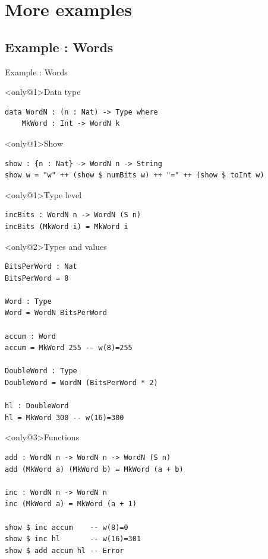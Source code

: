 \documentclass{beamer}
\begin{document}

\section{More examples}
\subsection{Example : Words}
\begin{frame}[fragile]{Example : Words}
	
	\begin{block}<only@1>{Data type}
		\begin{lstlisting}[basicstyle=\ttfamily\scriptsize]
data WordN : (n : Nat) -> Type where
	MkWord : Int -> WordN k
		\end{lstlisting}
	\end{block}
	\begin{block}<only@1>{Show}
	\begin{lstlisting}[basicstyle=\ttfamily\scriptsize]
show : {n : Nat} -> WordN n -> String
show w = "w" ++ (show $ numBits w) ++ "=" ++ (show $ toInt w)
		\end{lstlisting}
	\end{block}
	\begin{block}<only@1>{Type level}
	\begin{lstlisting}[basicstyle=\ttfamily\scriptsize]
incBits : WordN n -> WordN (S n)
incBits (MkWord i) = MkWord i
		\end{lstlisting}
	\end{block}
	
	
	\begin{block}<only@2>{Types and values}
		\begin{lstlisting}[basicstyle=\ttfamily\scriptsize]
BitsPerWord : Nat
BitsPerWord = 8

Word : Type
Word = WordN BitsPerWord

accum : Word
accum = MkWord 255 -- w(8)=255

DoubleWord : Type
DoubleWord = WordN (BitsPerWord * 2)

hl : DoubleWord
hl = MkWord 300 -- w(16)=300
		\end{lstlisting}
	\end{block}

	
	\begin{block}<only@3>{Functions}
	\begin{lstlisting}[basicstyle=\ttfamily\scriptsize]
add : WordN n -> WordN n -> WordN (S n)
add (MkWord a) (MkWord b) = MkWord (a + b)

inc : WordN n -> WordN n
inc (MkWord a) = MkWord (a + 1)

show $ inc accum	-- w(8)=0
show $ inc hl		-- w(16)=301
show $ add accum hl	-- Error
	\end{lstlisting}
	\end{block}

\end{frame}
\end{document}

